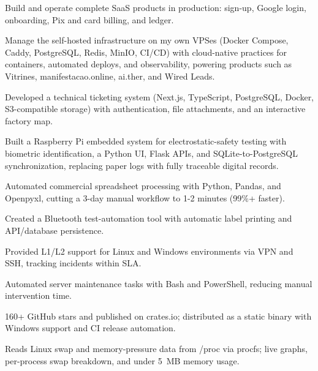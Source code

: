\begin{cvbullets}
  \item Build and operate complete SaaS products in production: sign-up, Google login, onboarding, Pix and card billing, and ledger.
  \item Manage the self-hosted infrastructure on my own VPSes (Docker Compose, Caddy, PostgreSQL, Redis, MinIO, CI/CD) with cloud-native practices for containers, automated deploys, and observability, powering products such as Vitrines, manifestacao.online, ai.ther, and Wired Leads.
\end{cvbullets}

\begin{cvbullets}
  \item Developed a technical ticketing system (Next.js, TypeScript, PostgreSQL, Docker, S3-compatible storage) with authentication, file attachments, and an interactive factory map.
  \item Built a Raspberry Pi embedded system for electrostatic-safety testing with biometric identification, a Python UI, Flask APIs, and SQLite-to-PostgreSQL synchronization, replacing paper logs with fully traceable digital records.
  \item Automated commercial spreadsheet processing with Python, Pandas, and Openpyxl, cutting a 3-day manual workflow to 1-2 minutes (99\%+ faster).
  \item Created a Bluetooth test-automation tool with automatic label printing and API/database persistence.
\end{cvbullets}

\begin{cvbullets}
  \item Provided L1/L2 support for Linux and Windows environments via VPN and SSH, tracking incidents within SLA.
  \item Automated server maintenance tasks with Bash and PowerShell, reducing manual intervention time.
\end{cvbullets}


\begin{cvbullets}
  \item 160+ GitHub stars and published on crates.io; distributed as a static binary with Windows support and CI release automation.
  \item Reads Linux swap and memory-pressure data from /proc via procfs; live graphs, per-process swap breakdown, and under 5~MB memory usage.
\end{cvbullets}


